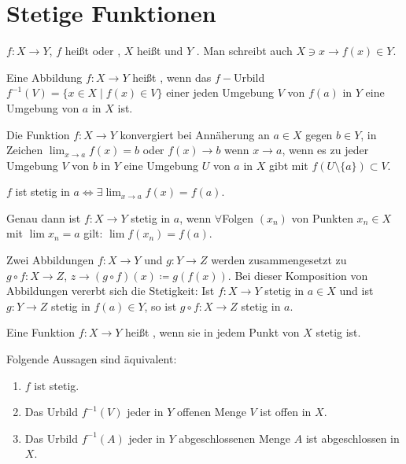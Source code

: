 \chapter{Stetige Funktionen}
$ f\colon X\rightarrow Y $, $ f $ hei\ss t  oder , $ X $ hei\ss t  und $ Y $ . Man schreibt auch $ X\ni x\rightarrow f(x)\in Y $.\\
\begin{definition}
Eine Abbildung $ f\colon X\rightarrow Y $ hei\ss t , wenn das $ f- $Urbild $ f^{-1}(V)=\lbrace x\in X\mid f(x)\in V\rbrace $ einer jeden Umgebung $ V $ von $ f(a) $ in $ Y $ eine Umgebung von $ a $ in $ X $ ist.
\end{definition}
\begin{definition}
Die Funktion $ f\colon X\rightarrow Y $ konvergiert bei Ann\"aherung an $ a\in X $ gegen $ b\in Y $, in Zeichen $ \lim_{x\to a} f(x)=b $ oder $ f(x)\rightarrow b $ wenn $ x\rightarrow a $, wenn es zu jeder Umgebung $ V $ von $ b $ in $ Y $ eine Umgebung $ U $ von $ a $ in $ X $ gibt mit $ f(U\setminus\lbrace a\rbrace)\subset V $.
\end{definition}
\begin{bemerkung*}
$ f $ ist stetig in $ a\Leftrightarrow\exists\lim_{x\to a}f(x)=f(a) $.
\end{bemerkung*}
\begin{satz}[Folgenkriterium]
Genau dann ist $ f\colon X\rightarrow Y $ stetig in $ a $, wenn $ \forall $Folgen $ (x_n) $ von Punkten $ x_n\in X $ mit $ \lim x_n=a $ gilt: $ \lim f(x_n)=f(a) $.
\end{satz}
Zwei Abbildungen $ f\colon X\rightarrow Y $ und $ g\colon Y\rightarrow Z $ werden zusammengesetzt zu $ g\circ f\colon X\rightarrow Z $, $ z\rightarrow (g\circ f)(x)\coloneqq g(f(x)) $. Bei dieser Komposition von Abbildungen vererbt sich die Stetigkeit: Ist $ f\colon X\rightarrow Y $ stetig in $ a\in X $ und ist $ g\colon Y\rightarrow Z $ stetig in $ f(a)\in Y $, so ist $ g\circ f\colon X\rightarrow Z $ stetig in $ a $.\\
\begin{definition}
Eine Funktion $ f\colon X\rightarrow Y $ hei\ss t , wenn sie in jedem Punkt von $ X $ stetig ist.
\end{definition}
\begin{satz}[Stetigkeitskriterium]
Folgende Aussagen sind \"aquivalent:
\begin{enumerate}
\item $ f $ ist stetig.
\item Das Urbild $ f^{-1}(V) $ jeder in $ Y $ offenen Menge $ V $ ist offen in $ X $.
\item Das Urbild $ f^{-1}(A) $ jeder in $ Y $ abgeschlossenen Menge $ A $ ist abgeschlossen in $ X $.
\end{enumerate}
\end{satz}

